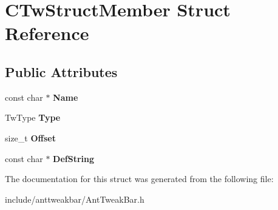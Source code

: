 \hypertarget{structCTwStructMember}{\section{\-C\-Tw\-Struct\-Member \-Struct \-Reference}
\label{structCTwStructMember}
}
\subsection*{\-Public \-Attributes}
\begin{DoxyCompactItemize}
\item 
\hypertarget{structCTwStructMember_a479a5c49a185f7902eeab9eb67677263}{const char $\ast$ {\bfseries \-Name}}\label{structCTwStructMember_a479a5c49a185f7902eeab9eb67677263}

\item 
\hypertarget{structCTwStructMember_ae0cbefc1430a6a56c7a0bbb5c1530e14}{\-Tw\-Type {\bfseries \-Type}}\label{structCTwStructMember_ae0cbefc1430a6a56c7a0bbb5c1530e14}

\item 
\hypertarget{structCTwStructMember_abe124eb9da8e2fe54503598ac7d8cdf4}{size\-\_\-t {\bfseries \-Offset}}\label{structCTwStructMember_abe124eb9da8e2fe54503598ac7d8cdf4}

\item 
\hypertarget{structCTwStructMember_aec7ad30961b7ff18d5d1bc4437a133df}{const char $\ast$ {\bfseries \-Def\-String}}\label{structCTwStructMember_aec7ad30961b7ff18d5d1bc4437a133df}

\end{DoxyCompactItemize}


\-The documentation for this struct was generated from the following file\-:\begin{DoxyCompactItemize}
\item 
include/anttweakbar/\-Ant\-Tweak\-Bar.\-h\end{DoxyCompactItemize}
